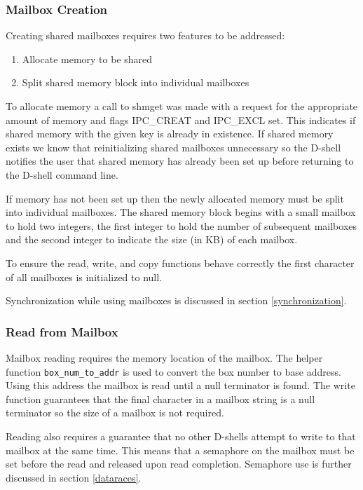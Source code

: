 \documentclass[11pt]{article}
\begin{document}
\begin{multicols}{2}
\subsubsection{Mailbox Creation}
Creating shared mailboxes requires two features to be addressed:
\begin{enumerate}
\item Allocate memory to be shared
\item Split shared memory block into individual mailboxes
\end{enumerate}

To allocate memory a call to shmget was made with a request for the appropriate amount of memory and flags IPC\_CREAT and IPC\_EXCL set. This indicates if shared memory with the given key is already in existence. If shared memory exists we know that reinitializing shared mailboxes unnecessary so the D-shell notifies the user that shared memory has already been set up before returning to the D-shell command line.

If memory has not been set up then the newly allocated memory must be split into individual mailboxes. The shared memory block begins with a small mailbox to hold two integers, the first integer to hold the number of subsequent mailboxes and the second integer to indicate the size (in KB) of each mailbox. 

To ensure the read, write, and copy functions behave correctly the first character of all mailboxes is initialized to null.

Synchronization while using mailboxes is discussed in section \ref{synchronization}.

\subsubsection{Read from Mailbox}
Mailbox reading requires the memory location of the mailbox. The helper function \texttt{box\_num\_to\_addr} is used to convert the box number to base address. Using this address the mailbox is read until a null terminator is found. The write function guarantees that the final character in a mailbox string is a null terminator so the size of a mailbox is not required.

Reading also requires a guarantee that no other D-shells attempt to write to that mailbox at the same time. This means that a semaphore on the mailbox must be set before the read and released upon read completion. Semaphore use is further discussed in section \ref{dataraces}.


\end{multicols}
\end{document}
